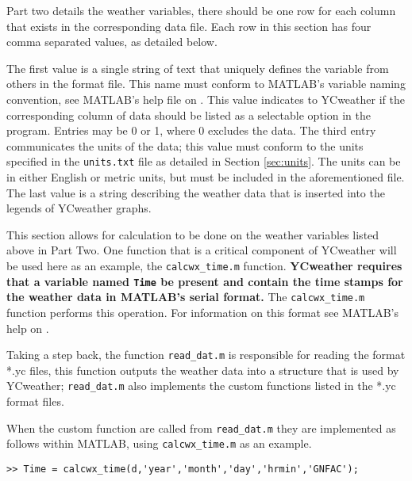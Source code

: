 Part two details the weather variables, there should be one row for each column that exists in the corresponding data file.  Each row in this section has four comma separated values, as detailed below.

\begin{enumerate}
	 The first value is a single string of text that uniquely defines the variable from others in the format file. This name must conform to MATLAB's variable naming convention, see MATLAB's help file on .
	 This value indicates to YCweather if the corresponding column of data should be listed as a selectable option in the program.  Entries may be 0 or 1, where 0 excludes the data.
	 The third entry communicates the units of the data; this value must conform to the units specified in the \texttt{units.txt} file as detailed in Section \ref{sec:units}.  The units can be in either English or metric units, but must be included in the aforementioned file.
	 The last value is a string describing the weather data that is inserted into the legends of YCweather graphs.
\end{enumerate}

This section allows for calculation to be done on the weather variables listed above in Part Two.  One function that is a critical component of YCweather will be used here as an example, the \texttt{calcwx\_time.m} function. \textbf{YCweather requires that a variable named \texttt{Time} be present and contain the time stamps for the weather data in MATLAB's serial format.} The \texttt{calcwx\_time.m} function performs this operation. For information on this format see MATLAB's help on .  

Taking a step back, the function \texttt{read\_dat.m} is responsible for reading the format *.yc files, this function outputs the weather data into a structure that is used by YCweather; \texttt{read\_dat.m} also implements the custom functions listed in the *.yc format files.

When the custom function are called from \texttt{read\_dat.m} they are implemented as follows within MATLAB, using \texttt{calcwx\_time.m} as an example.
\begin{Verbatim}[fontsize=\small , frame=single, label=MATLAB]
>> Time = calcwx_time(d,'year','month','day','hrmin','GNFAC');
\end{Verbatim}

